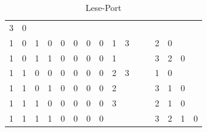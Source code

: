 \begin{table}[htbp]
\begin{minipage}{\textwidth}
\begin{tabular}{cccccccccccccccc}
		\multicolumn{1}{c}{3} & \multicolumn{1}{c}{0} & \multicolumn{1}{c}{}& \multicolumn{1}{c}{} \\
		\multicolumn{1}{c}{1} & \multicolumn{1}{c}{0} & \multicolumn{1}{c}{1} & \multicolumn{1}{c}{0} &
		\multicolumn{1}{c}{0} & \multicolumn{1}{c}{0} & \multicolumn{1}{c}{0} & \multicolumn{1}{c}{0} &
		\multicolumn{1}{|c}{1} & \multicolumn{1}{c}{3} & \multicolumn{1}{c}{}& \multicolumn{1}{c}{} &
		\multicolumn{1}{c}{2} & \multicolumn{1}{c}{0} & \multicolumn{1}{c}{}& \multicolumn{1}{c}{} \\
		\multicolumn{1}{c}{1} & \multicolumn{1}{c}{0} & \multicolumn{1}{c}{1} & \multicolumn{1}{c}{1} &
		\multicolumn{1}{c}{0} & \multicolumn{1}{c}{0} & \multicolumn{1}{c}{0} & \multicolumn{1}{c}{0} &
		\multicolumn{1}{|c}{1} & \multicolumn{1}{c}{} & \multicolumn{1}{c}{}& \multicolumn{1}{c}{} &
		\multicolumn{1}{c}{3} & \multicolumn{1}{c}{2} & \multicolumn{1}{c}{0}& \multicolumn{1}{c}{} \\
		\multicolumn{1}{c}{1} & \multicolumn{1}{c}{1} & \multicolumn{1}{c}{0} & \multicolumn{1}{c}{0} &
		\multicolumn{1}{c}{0} & \multicolumn{1}{c}{0} & \multicolumn{1}{c}{0} & \multicolumn{1}{c}{0} &
		\multicolumn{1}{|c}{2} & \multicolumn{1}{c}{3} & \multicolumn{1}{c}{}& \multicolumn{1}{c}{} &
		\multicolumn{1}{c}{1} & \multicolumn{1}{c}{0} & \multicolumn{1}{c}{}& \multicolumn{1}{c}{} \\
		\multicolumn{1}{c}{1} & \multicolumn{1}{c}{1} & \multicolumn{1}{c}{0} & \multicolumn{1}{c}{1} &
		\multicolumn{1}{c}{0} & \multicolumn{1}{c}{0} & \multicolumn{1}{c}{0} & \multicolumn{1}{c}{0} &
		\multicolumn{1}{|c}{2} & \multicolumn{1}{c}{} & \multicolumn{1}{c}{}& \multicolumn{1}{c}{} &
		\multicolumn{1}{c}{3} & \multicolumn{1}{c}{1} & \multicolumn{1}{c}{0}& \multicolumn{1}{c}{} \\
		\multicolumn{1}{c}{1} & \multicolumn{1}{c}{1} & \multicolumn{1}{c}{1} & \multicolumn{1}{c}{0} &
				\multicolumn{1}{c}{0} & \multicolumn{1}{c}{0} & \multicolumn{1}{c}{0} & \multicolumn{1}{c}{0} &
		\multicolumn{1}{|c}{3} & \multicolumn{1}{c}{} & \multicolumn{1}{c}{}& \multicolumn{1}{c}{} &
		\multicolumn{1}{c}{2} & \multicolumn{1}{c}{1} & \multicolumn{1}{c}{0}& \multicolumn{1}{c}{} \\
		\multicolumn{1}{c}{1} & \multicolumn{1}{c}{1} & \multicolumn{1}{c}{1} & \multicolumn{1}{c}{1} &
				\multicolumn{1}{c}{0} & \multicolumn{1}{c}{0} & \multicolumn{1}{c}{0} & \multicolumn{1}{c}{0} &
		\multicolumn{1}{|c}{} & \multicolumn{1}{c}{} & \multicolumn{1}{c}{}& \multicolumn{1}{c}{} &
		\multicolumn{1}{c}{3} & \multicolumn{1}{c}{2} & \multicolumn{1}{c}{1}& \multicolumn{1}{c}{0} \\
		
	\end{tabular}
	\caption{\label{lese-port}Lese-Port}

	\end{minipage}
\end{table}

